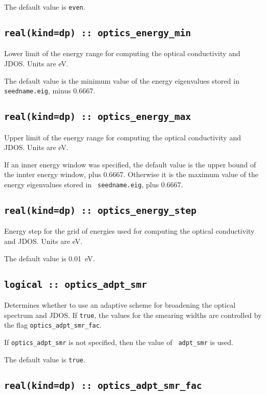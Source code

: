 The default value is {\tt even}.


\subsection[optics\_energy\_min]{\tt real(kind=dp) :: optics\_energy\_min}
Lower limit of the energy range for computing the optical conductivity
and JDOS.  Units are eV.

The default value is the minimum value of the energy eigenvalues
stored in {\tt seedname.eig}, minus 0.6667.

\subsection[optics\_energy\_max]{\tt real(kind=dp) :: optics\_energy\_max}
Upper limit of the energy range for computing the optical conductivity
and JDOS.  Units are eV.

If an inner energy window was specified, the default value is the
upper bound of the innter energy window, plus 0.6667.  Otherwise it is
the maximum value of the energy eigenvalues stored in {\tt
  seedname.eig}, plus 0.6667.

\subsection[optics\_energy\_step]{\tt real(kind=dp) :: optics\_energy\_step}
Energy step for the grid of energies used for computing the optical
conductivity and JDOS. Units are eV.

The default value is 0.01~eV.


\subsection[optics\_adpt\_smr]{\tt logical :: optics\_adpt\_smr}
Determines whether to use an adaptive scheme for broadening the
optical spectrum and JDOS. If \verb#true#, the values for the smearing widths are 
controlled by the flag {\tt optics\_adpt\_smr\_fac}.

If {\tt optics\_adpt\_smr} is not specified, then the value of {\tt
  adpt\_smr} is used.  

The default value is \verb#true#.


\subsection[optics\_adpt\_smr\_fac]{\tt real(kind=dp) ::
  optics\_adpt\_smr\_fac}


